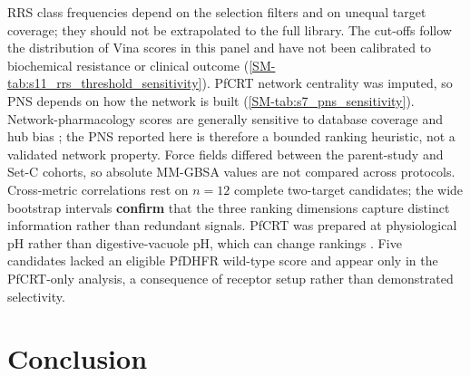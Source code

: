 \documentclass[journal=jcisd8,manuscript=article,layout=traditional]{achemso}
\begin{document}
RRS class frequencies depend on the selection filters and on unequal target coverage; they should not be extrapolated to the full library. The cut-offs follow the distribution of Vina scores in this panel and have not been calibrated to biochemical resistance or clinical outcome (\cref{SM-tab:s11_rrs_threshold_sensitivity}). PfCRT network centrality was imputed, so PNS depends on how the network is built (\cref{SM-tab:s7_pns_sensitivity}). Network-pharmacology scores are generally sensitive to database coverage and hub bias \citep{panossian2025pitfalls}; the PNS reported here is therefore a bounded ranking heuristic, not a validated network property. Force fields differed between the parent-study and Set-C cohorts, so absolute MM-GBSA values are not compared across protocols. Cross-metric correlations rest on $n=12$ complete two-target candidates; the wide bootstrap intervals \textbf{confirm} that the three ranking dimensions capture distinct information rather than redundant signals. PfCRT was prepared at physiological pH rather than digestive-vacuole pH, which can change rankings \citep{temgoua2026chemrxiv}. Five candidates lacked an eligible PfDHFR wild-type score and appear only in the PfCRT-only analysis, a consequence of receptor setup rather than demonstrated selectivity.


\section{Conclusion}
\end{document}
